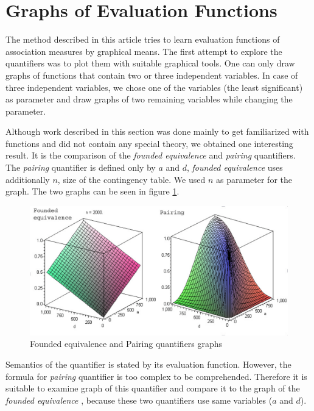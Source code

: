 \section{Graphs of Evaluation Functions} \label{Graphs}

The method described in this article tries to learn evaluation functions of association measures by graphical means. The first attempt to explore the quantifiers was to plot them with suitable graphical tools. One can only draw graphs of functions that contain two or three independent variables. In case of three independent variables, we chose one of the variables (the least significant) as parameter and draw graphs of two remaining variables while changing the parameter. 

Although work described in this section was done mainly to get familiarized with functions and did not contain any special theory, we obtained one interesting result. It is the comparison of the {\it founded equivalence \/}
and {\it pairing \/} quantifiers. The {\it pairing \/} quantifier is defined only by $a$ and
$d$, {\it founded equivalence \/} uses additionally $n$, size of the contingency table. We used
$n$ as parameter for the graph. The two graphs can be seen in figure \ref{fig:FEPairing}.

\begin{figure}[ht]
\centering
\includegraphics[width=115mm]{FE-Pairing.eps}
\caption{Founded equivalence and Pairing quantifiers graphs}
\label{fig:FEPairing}
\end{figure}

Semantics of the quantifier is stated by its evaluation function. However, the formula for 
{\it pairing \/} quantifier is too complex to be comprehended. Therefore it is suitable to examine graph of this quantifier and compare it to the graph of the {\it founded equivalence \/}, because these two quantifiers use same variables ($a$ and $d$). 

